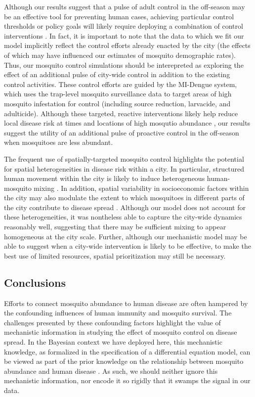 \documentclass[10pt,letterpaper]{article}
\begin{document}
Although our results suggest that a pulse of adult control in the off-season may be an effective tool for preventing human cases, achieving particular control thresholds or policy goals will likely require deploying a combination of control interventions \cite{Brady2016}.
In fact, it is important to note that the data to which we fit our model implicitly reflect the control efforts already enacted by the city (the effects of which may have influenced our estimates of mosquito demographic rates).
Thus, our mosquito control simulations should be interepreted as exploring the effect of an additional pulse of city-wide control in addition to the existing control activities.
These control efforts are guided by the MI-Dengue system, which uses the trap-level mosquito surveillance data to target areas of high mosquito infestation for control (including source reduction, larvacide, and adulticide)\cite{Eiras2009}.
Although these targeted, reactive interventions likely help reduce local disease risk at times and locations of high mosqutio abundance \cite{Pepin2013}, our results suggest the utility of an additional pulse of proactive control in the off-season when mosquitoes are less abundant.

The frequent use of spatially-targeted mosquito control highlights the potential for spatial heterogeneities in disease risk within a city.
In particular, structured human movement within the city is likely to induce heterogeneous human-mosquito mixing \cite{Adams2009, Cosner2009a, Stoddard2009}.
In addition, spatial variability in socioeconomic factors within the city may also modulate the extent to which mosquitoes in different parts of the city contribute to disease spread \cite{Mondini2008, Honorio2009, Hu2012, DeMattosAlmeida2007}.
Although our model does not account for these heterogeneities, it was nontheless able to capture the city-wide dynamics reasonably well, suggesting that there may be sufficient mixing to appear homogeneous at the city scale.
Further, although our mechanistic model may be able to suggest when a city-wide intervention is likely to be effective, to make the best use of limited resources, spatial prioritization may still be necessary.

\subsection*{Conclusions}

Efforts to connect mosquito abundance to human disease are often hampered by the confounding influences of human immunity and mosquito survival.
The challenges presented by these confounding factors highlight the value of mechanistic information in studying the effect of mosquito control on disease spread.
In the Bayesian context we have deployed here, this mechanistic knowledge, as formalized in the specification of a differential equation model, can be viewed as part of the prior knowledge on the relationship between mosquito abundance and human disease \cite{Ellner1998, Wikle2010}.
As such, we should neither ignore this mechanistic information, nor encode it so rigidly that it swamps the signal in our data.
\end{document}
